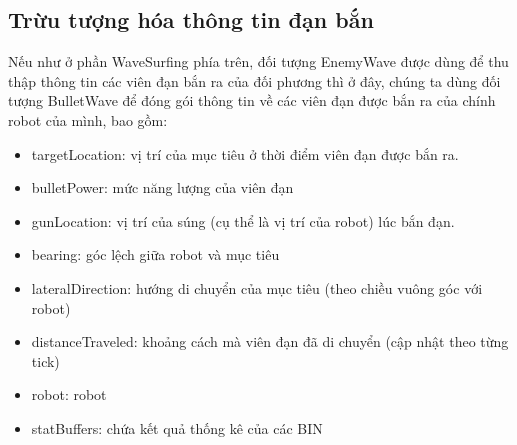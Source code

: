 \documentclass[14pt]{article}
\begin{document}
\subsection{Trừu tượng hóa thông tin đạn bắn}
Nếu như ở phần WaveSurfing phía trên, đối tượng EnemyWave được dùng để thu thập thông tin các viên đạn bắn ra của đối phương thì ở đây, chúng ta dùng đối tượng BulletWave để đóng gói thông tin về các viên đạn được bắn ra của chính robot của mình, bao gồm:
	\begin{itemize}
		\item targetLocation: vị trí của mục tiêu ở thời điểm viên đạn được bắn ra.
		\item bulletPower: mức năng lượng của viên đạn
		\item gunLocation: vị trí của súng (cụ thể là vị trí của robot) lúc bắn đạn.
		\item bearing: góc lệch giữa robot và mục tiêu
		\item lateralDirection: hướng di chuyển của mục tiêu (theo chiều vuông góc với robot)
		\item distanceTraveled: khoảng cách mà viên đạn đã di chuyển (cập nhật theo từng tick)
		\item robot: robot
		\item statBuffers: chứa kết quả thống kê của các BIN
	\end{itemize}
\end{document}
